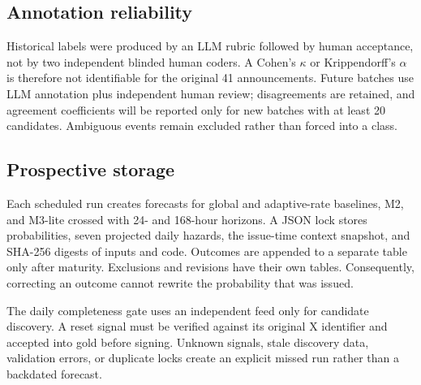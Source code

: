 \subsection{Annotation reliability}

Historical labels were produced by an LLM rubric followed by human acceptance, not by two
independent blinded human coders. A Cohen's $\kappa$ or Krippendorff's $\alpha$ is therefore not
identifiable for the original 41 announcements. Future batches use LLM annotation plus independent
human review; disagreements are retained, and agreement coefficients will be reported only for new
batches with at least 20 candidates. Ambiguous events remain excluded rather than forced into a
class.

\subsection{Prospective storage}

Each scheduled run creates forecasts for global and adaptive-rate baselines, M2, and M3-lite crossed
with 24- and 168-hour horizons. A
JSON lock stores probabilities, seven projected daily hazards, the issue-time context snapshot, and
SHA-256 digests of inputs and code. Outcomes are appended to a separate table only after maturity.
Exclusions and revisions have their own tables. Consequently, correcting an outcome cannot rewrite
the probability that was issued.

The daily completeness gate uses an independent feed only for candidate discovery. A reset signal
must be verified against its original X identifier and accepted into gold before signing. Unknown
signals, stale discovery data, validation errors, or duplicate locks create an explicit missed run
rather than a backdated forecast.
